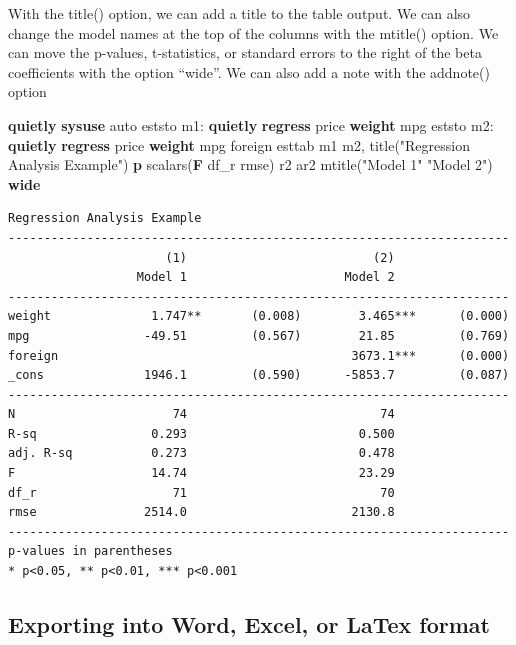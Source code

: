 \documentclass[
]{book}
\newenvironment{Shaded}{\begin{snugshade}}{\end{snugshade}}
\newcommand{\BaseNTok}[1]{\textcolor[rgb]{0.00,0.00,0.81}{#1}}
\newcommand{\FunctionTok}[1]{\textcolor[rgb]{0.13,0.29,0.53}{\textbf{#1}}}
\newcommand{\KeywordTok}[1]{\textcolor[rgb]{0.13,0.29,0.53}{\textbf{#1}}}
\newcommand{\NormalTok}[1]{#1}
\newcommand{\StringTok}[1]{\textcolor[rgb]{0.31,0.60,0.02}{#1}}
\begin{document}
With the title() option, we can add a title to the table output. We can also change the model names at the top of the columns with the mtitle() option. We can move the p-values, t-statistics, or standard errors to the right of the beta coefficients with the option ``wide''. We can also add a note with the addnote() option

\begin{Shaded}
\begin{Highlighting}[]
\KeywordTok{quietly} \KeywordTok{sysuse}\NormalTok{ auto}
\NormalTok{eststo m1: }\KeywordTok{quietly} \KeywordTok{regress}\NormalTok{ price }\KeywordTok{weight}\NormalTok{ mpg}
\NormalTok{eststo m2: }\KeywordTok{quietly} \KeywordTok{regress}\NormalTok{ price }\KeywordTok{weight}\NormalTok{ mpg foreign}
\NormalTok{esttab m1 m2, }\BaseNTok{title}\NormalTok{(}\StringTok{"Regression Analysis Example"}\NormalTok{) }\KeywordTok{p}\NormalTok{ scalars(}\FunctionTok{F}\NormalTok{ df\_r rmse) r2 ar2 mtitle(}\StringTok{"Model 1"} \StringTok{"Model 2"}\NormalTok{) }\KeywordTok{wide}
\end{Highlighting}
\end{Shaded}

\begin{verbatim}
Regression Analysis Example
----------------------------------------------------------------------
                      (1)                          (2)                
                  Model 1                      Model 2                
----------------------------------------------------------------------
weight              1.747**       (0.008)        3.465***      (0.000)
mpg                -49.51         (0.567)        21.85         (0.769)
foreign                                         3673.1***      (0.000)
_cons              1946.1         (0.590)      -5853.7         (0.087)
----------------------------------------------------------------------
N                      74                           74                
R-sq                0.293                        0.500                
adj. R-sq           0.273                        0.478                
F                   14.74                        23.29                
df_r                   71                           70                
rmse               2514.0                       2130.8                
----------------------------------------------------------------------
p-values in parentheses
* p<0.05, ** p<0.01, *** p<0.001
\end{verbatim}

\subsection{Exporting into Word, Excel, or LaTex format}\label{exporting-into-word-excel-or-latex-format}
\end{document}
